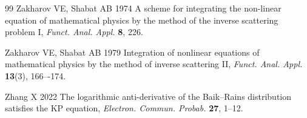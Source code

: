 \documentclass[5p,twocolumn]{elsarticle}
\begin{document}
\begin{thebibliography}{99}
 Zakharov VE, Shabat AB 1974 A scheme for integrating the non-linear equation of mathematical physics by the method of the inverse scattering problem I, \textit{Funct. Anal. Appl.}\/ \textbf{8}, 226. 

 Zakharov VE, Shabat AB 1979 Integration of nonlinear equations of mathematical physics by the method of inverse scattering II, \textit{Funct. Anal. Appl.} \textbf{13}(3), 166–-174.
  
 Zhang X 2022 The logarithmic anti-derivative of the Baik--Rains distribution satisfies the KP equation, \textit{Electron. Commun. Probab.} \textbf{27}, 1--12.
  
\end{thebibliography}
\end{document}
